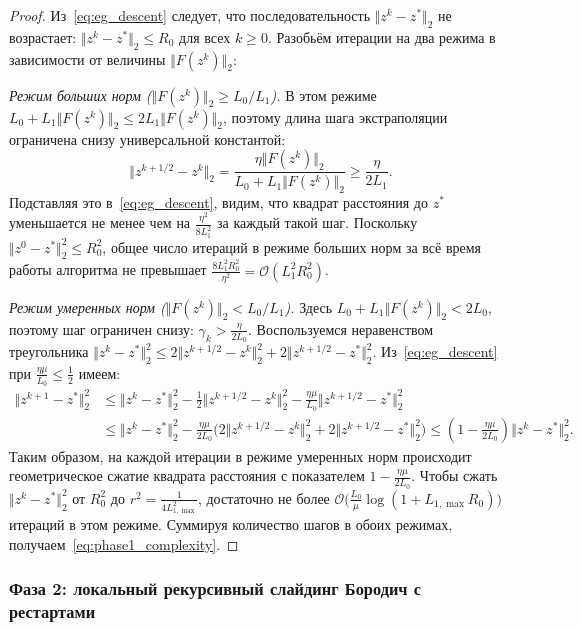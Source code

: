 \documentclass[11pt, a4paper]{article}
\theoremstyle{definition}
\begin{document}
\begin{proof}
Из~\eqref{eq:eg_descent} следует, что последовательность $\Vert z^k - z^* \Vert_2$ не возрастает: $\Vert z^k - z^* \Vert_2 \le R_0$ для всех $k \ge 0$. Разобьём итерации на два режима в зависимости от величины $\Vert F(z^k) \Vert_2$:

\emph{Режим больших норм ($\Vert F(z^k) \Vert_2 \ge L_0 / L_1$).} В этом режиме $L_0 + L_1 \Vert F(z^k) \Vert_2 \le 2 L_1 \Vert F(z^k) \Vert_2$, поэтому длина шага экстраполяции ограничена снизу универсальной константой:
\[
\Vert z^{k+1/2} - z^k \Vert_2 = \frac{\eta \Vert F(z^k) \Vert_2}{L_0 + L_1 \Vert F(z^k) \Vert_2} \ge \frac{\eta}{2 L_1}.
\]
Подставляя это в~\eqref{eq:eg_descent}, видим, что квадрат расстояния до $z^*$ уменьшается не менее чем на $\frac{\eta^2}{8 L_1^2}$ за каждый такой шаг. Поскольку $\Vert z^0 - z^* \Vert_2^2 \le R_0^2$, общее число итераций в режиме больших норм за всё время работы алгоритма не превышает $\frac{8 L_1^2 R_0^2}{\eta^2} = \mathcal{O}(L_1^2 R_0^2)$.

\emph{Режим умеренных норм ($\Vert F(z^k) \Vert_2 < L_0 / L_1$).} Здесь $L_0 + L_1 \Vert F(z^k) \Vert_2 < 2 L_0$, поэтому шаг ограничен снизу: $\gamma_k > \frac{\eta}{2 L_0}$. Воспользуемся неравенством треугольника $\Vert z^k - z^* \Vert_2^2 \le 2 \Vert z^{k+1/2} - z^k \Vert_2^2 + 2 \Vert z^{k+1/2} - z^* \Vert_2^2$. Из~\eqref{eq:eg_descent} при $\frac{\eta \mu}{L_0} \le \frac{1}{2}$ имеем:
\begin{align*}
\Vert z^{k+1} - z^* \Vert_2^2 &\le \Vert z^k - z^* \Vert_2^2 - \frac{1}{2}\Vert z^{k+1/2} - z^k \Vert_2^2 - \frac{\eta \mu}{L_0}\Vert z^{k+1/2} - z^* \Vert_2^2 \\
&\le \Vert z^k - z^* \Vert_2^2 - \frac{\eta \mu}{2 L_0}\Big(2\Vert z^{k+1/2} - z^k \Vert_2^2 + 2\Vert z^{k+1/2} - z^* \Vert_2^2\Big) \le \left(1 - \frac{\eta \mu}{2 L_0}\right)\Vert z^k - z^* \Vert_2^2.
\end{align*}
Таким образом, на каждой итерации в режиме умеренных норм происходит геометрическое сжатие квадрата расстояния с показателем $1 - \frac{\eta \mu}{2 L_0}$. Чтобы сжать $\Vert z^k - z^* \Vert_2^2$ от $R_0^2$ до $r^2 = \frac{1}{4 L_{1,\max}^2}$, достаточно не более $\mathcal{O}\big(\frac{L_0}{\mu}\log(1 + L_{1,\max} R_0)\big)$ итераций в этом режиме. Суммируя количество шагов в обоих режимах, получаем~\eqref{eq:phase1_complexity}.
\end{proof}

\subsubsection{Фаза 2: локальный рекурсивный слайдинг Бородич с рестартами}
\end{document}

